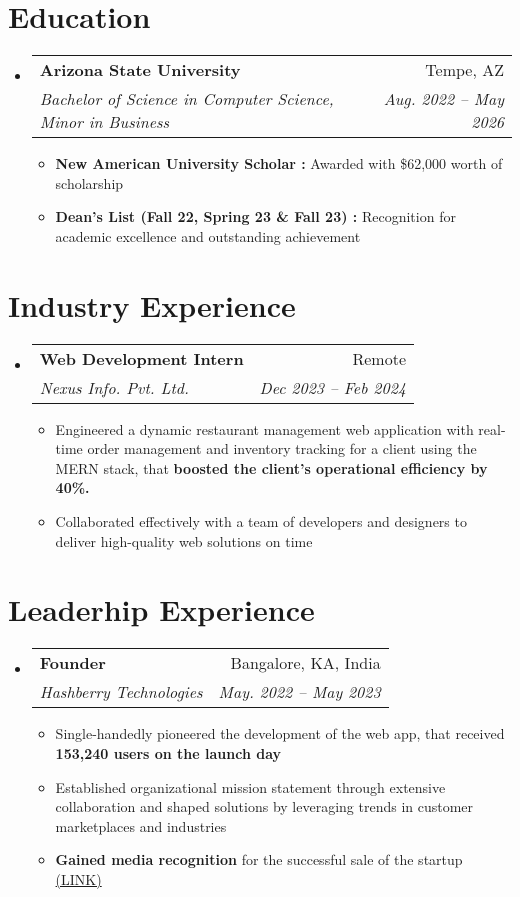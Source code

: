 \documentclass[letterpaper,11pt]{article}
\makeatletter
\newcommand{\resumeItem}[1]{
  \item\small{
    {#1 \vspace{-2pt}}
  }
}
\newcommand{\resumeSubheading}[4]{
  \vspace{-2pt}\item
    \begin{tabular*}{0.97\textwidth}[t]{l@{\extracolsep{\fill}}r}
      \textbf{#1} & #2 \\
      \textit{\small#3} & \textit{\small #4} \\
    \end{tabular*}\vspace{-7pt}
}
\newcommand{\resumeSubSubheading}[2]{
    \item
    \begin{tabular*}{0.97\textwidth}{l@{\extracolsep{\fill}}r}
      \textit{\small#1} & \textit{\small #2} \\
    \end{tabular*}\vspace{-7pt}
}
\newcommand{\resumeSubHeadingListStart}{\begin{itemize}[leftmargin=0.15in, label={}]}
\newcommand{\resumeSubHeadingListEnd}{\end{itemize}}
\newcommand{\resumeItemListStart}{\begin{itemize}}
\newcommand{\resumeItemListEnd}{\end{itemize}\vspace{-5pt}}
\makeatother
\begin{document}
\section{Education}
  \resumeSubHeadingListStart
    \resumeSubheading
      {Arizona State University}{Tempe, AZ}
      {Bachelor of Science in Computer Science, Minor in Business}{Aug. 2022 -- May 2026}
      \resumeItemListStart
        \resumeItem{\textbf{New American University Scholar :} Awarded with \$62,000 worth of scholarship}
        \resumeItem{\textbf{Dean’s List (Fall 22, Spring 23 \& Fall 23) :} Recognition for academic excellence and outstanding achievement}      
      \resumeItemListEnd
   
\resumeSubHeadingListEnd

\section{Industry Experience}
  \resumeSubHeadingListStart

    \resumeSubheading
      {Web Development Intern}{Remote}
      {Nexus Info. Pvt. Ltd.}{Dec 2023 -- Feb 2024}
      \resumeItemListStart
        \resumeItem{Engineered a dynamic restaurant management web application with real-time order management and inventory tracking for a client using the MERN stack, that \textbf{boosted the client's operational efficiency by 40\%.}}
        \resumeItem{Collaborated effectively with a team of developers and designers to deliver high-quality web solutions on time}
      \resumeItemListEnd


      


  \resumeSubHeadingListEnd

\section{Leaderhip Experience}
  \resumeSubHeadingListStart
    \resumeSubheading
      {Founder}{Bangalore, KA, India}
      {Hashberry Technologies}{May. 2022 -- May 2023}
      \resumeItemListStart
        \resumeItem{Single-handedly pioneered the development of the web app, that received \textbf{153,240 users on the launch day}}
        \resumeItem{Established organizational mission statement through extensive collaboration and shaped solutions by leveraging trends in customer marketplaces and industries}
        \resumeItem{\textbf{Gained media recognition} for the successful sale of the startup 
\href{https://www.deccanherald.com/brandspot/sponsored/meet-the-crypto-boy-of-bengaluru-1221031.html}{(LINK)}}
      \resumeItemListEnd
\resumeSubHeadingListEnd
\end{document}
